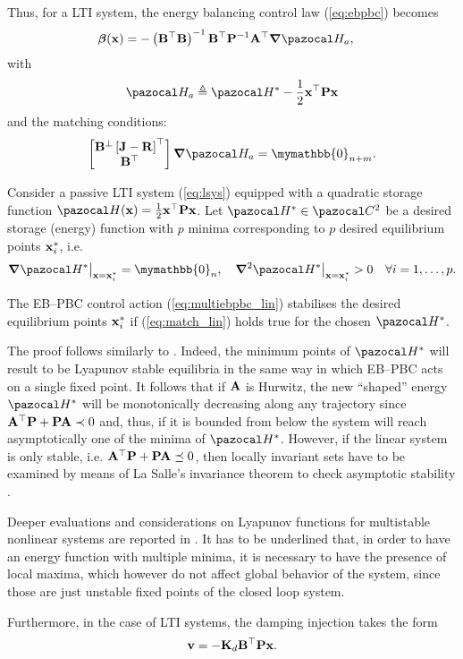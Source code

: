 Thus, for a LTI system, the energy balancing control law (\ref{eq:ebpbc}) becomes 
%
\begin{align}\label{eq:multiebpbc_lin}
    \bm\beta(\xb) &= -\left(\Bb^\top\Bb\right)^{-1}\Bb^\top\Pb^{-1}\Ab^\top\bm\nabla\Ha_a,
\end{align}
%
with
%
\begin{equation}
    \Ha_a\triangleq\Ha^*-\frac{1}{2}\xb^\top \Pb\xb
\end{equation}
%
and the matching conditions:
%
\begin{equation}\label{eq:match_lin}
    \begin{bmatrix}
        {\Bb}^{\perp}\left[\Jb-\Rb\right]^\top\\
        {\Bb}^\top
    \end{bmatrix}
    \bm\nabla\Ha_a =\mymathbb{0}_{n+m}.
\end{equation}
%
\begin{prop}
	Consider a passive LTI system (\ref{eq:lsys}) equipped with a quadratic storage function $\Ha(\xb) = \frac{1}{2}\xb^\top \Pb\xb$. Let $\Ha^*\in\C^2$ be a desired storage (energy) function with $p$ minima corresponding to $p$ desired equilibrium points $\mathbf{x}^*_i$, i.e.
	\begin{equation}
	\bm\nabla\Ha^*\big|_{\xb = \xb^*_i} = \mymathbb{0}_n,~~~ \bm\nabla^2 \Ha^*\big|_{\xb = \xb^*_i}>0\quad\forall i = 1,\dots,p.
	\end{equation}
	
	The EB--PBC control action (\ref{eq:multiebpbc_lin})
	stabilises the desired equilibrium points $\mathbf{x}^*_i$ if (\ref{eq:match_lin}) holds true for the chosen $\Ha^*$.
\end{prop}
%
\proof
The proof follows similarly to \citep{ortega2008control}. Indeed, the minimum points of $\Ha^*$ will result to be Lyapunov stable equilibria in the same way in which EB--PBC acts on a single fixed point. It follows that if $\mathbf{A}$ is Hurwitz, the new ``shaped'' energy $\Ha^*$ will be monotonically decreasing along any trajectory since $\mathbf{A}^\top \mathbf{P} + \mathbf{P}\mathbf{A}\prec 0$ and, thus, if it is bounded from below the system will reach asymptotically one of the minima of $\Ha^*$. However, if the linear system is only stable, i.e. $\mathbf{A}^\top \mathbf{P} + \mathbf{P}\mathbf{A}\preceq 0$, then locally invariant sets have to be examined by means of La Salle’s invariance theorem to check asymptotic stability \citep{khalil2002nonlinear}.
\endproof
%
\begin{rem}
	Deeper evaluations and considerations on Lyapunov functions for multistable nonlinear systems are reported in \cite{efimov2012global}. It has to be underlined that, in order to have an energy function with multiple minima, it is necessary to have the presence of local maxima, which however do not affect global behavior of the system, since those are just unstable fixed points of the closed loop system.
	
\end{rem}
%
Furthermore, in the case of LTI systems, the damping injection takes the form
\begin{equation}
    \mathbf{v} = -\mathbf{K}_d\mathbf{B}^\top\mathbf{P}\mathbf{x}.
\end{equation}

